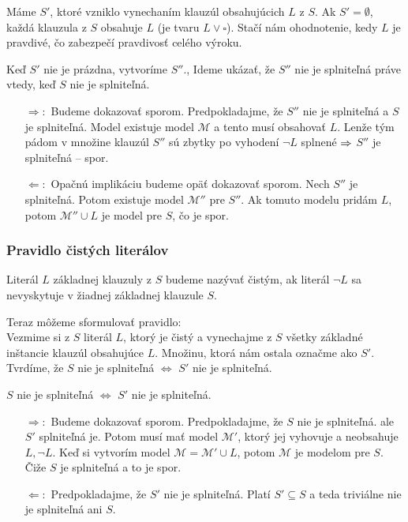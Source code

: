 \begin{dokaz}
    Máme $S'$, ktoré vzniklo vynechaním klauzúl obsahujúcich $L$ z $S$.
    Ak $S'=\emptyset$, každá klauzula z $S$ obsahuje $L$ 
    (je tvaru $L \lor \square$).
    Stačí nám ohodnotenie, kedy $L$ je pravdivé, čo zabezpečí
    pravdivosť celého výroku. 

    Keď $S'$ nie je prázdna, vytvoríme $S''$.,
    Ideme ukázať, že $S''$ nie je splniteľná práve vtedy,
    keď $S$ nie je splniteľná.

    \begin{itemize}
    \item[$\Rightarrow:$] Budeme dokazovať sporom.
        Predpokladajme, že $S''$ nie je splniteľná a $S$ je splniteľná.
        Model existuje model $\mathcal{M}$ a tento musí obsahovať $L$.
        Lenže tým pádom v množine klauzúl $S''$ sú zbytky po vyhodení
        $\neg L$ splnené $\Rightarrow$ $S''$ je splniteľná -- spor.

    \item[$\Leftarrow:$] Opačnú implikáciu budeme opäť dokazovať sporom.
        Nech $S''$ je splniteľná. Potom existuje model
        $\mathcal{M}''$ pre $S''$. Ak tomuto modelu pridám $L$, potom
        $\mathcal{M}'' \cup L$ je model pre $S$, čo je spor.
    \end{itemize}
\end{dokaz}
\subsubsection{Pravidlo čistých literálov}

\begin{definicia}
    Literál $L$ základnej klauzuly z $S$ budeme nazývať čistým,
    ak literál $\neg L$ sa nevyskytuje v žiadnej základnej klauzule $S$.
\end{definicia}

\noindent
Teraz môžeme sformulovať pravidlo: \\
Vezmime si z $S$ literál $L$, ktorý je čistý
a vynechajme z $S$ všetky základné inštancie klauzúl obsahujúce $L$.
Množinu, ktorá nám ostala označme ako $S'$.
Tvrdíme, že $S$ nie je splniteľná $\iff$ $S'$ nie je splniteľná.


\begin{dokaz}
    $S$ nie je splniteľná $\iff$ $S'$ nie je splniteľná.
    \begin{itemize}
    \item[$\Rightarrow:$] Budeme dokazovať sporom.
        Predpokladajme, že $S$ nie je splniteľná.
        ale $S'$ splniteľná je. Potom musí mať
        model $\mathcal{M}'$, ktorý jej vyhovuje a neobsahuje
        $L, \neg L$.  Keď si vytvorím model $\mathcal{M}=\mathcal{M}'\cup L$,
        potom $\mathcal{M}$ je modelom pre $S$. Čiže
        $S$ je splniteľná a to je spor.

    \item[$\Leftarrow:$] Predpokladajme, že
        $S'$ nie je splniteľná. Platí $S' \subseteq S$ a teda
        triviálne nie je splniteľná ani $S$.
    \end{itemize}
\end{dokaz}

